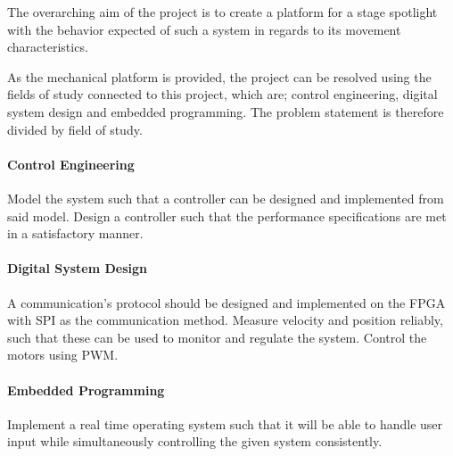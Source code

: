 \documentclass[../../main]{subfiles}
\begin{document}
The overarching aim of the project is to create a platform for a stage spotlight with the behavior expected of such a system in regards to its movement characteristics.

As the mechanical platform is provided, the project can be resolved using the fields of study connected to this project, which are; control engineering, digital system design and embedded programming.
The problem statement is therefore divided by field of study.




\paragraph{Control Engineering}%
\label{par:control_engineering}
Model the system such that a controller can be designed and implemented from said model.
Design a controller such that the performance specifications are met in a satisfactory manner.

\paragraph{Digital System Design}%
\label{par:digital_system_design}
A communication's protocol should be designed and implemented on the FPGA with SPI as the communication method. 
Measure velocity and position reliably, such that these can be used to monitor and regulate the
system.
Control the motors using PWM.

\paragraph{Embedded Programming}%
\label{par:emebedded_programming}
Implement a real time operating system such that it will be able to handle user input while simultaneously controlling the given system consistently.
\\
\end{document}
